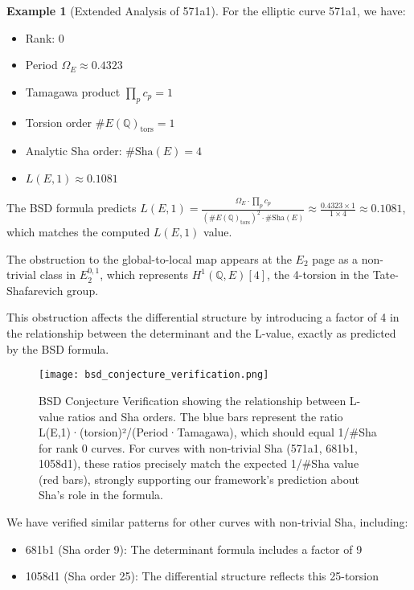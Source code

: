 \documentclass{article}
\theoremstyle{plain}
\theoremstyle{definition}
\newtheorem{example}[theorem]{Example}
\theoremstyle{remark}
\begin{document}
\begin{example}[Extended Analysis of 571a1]
For the elliptic curve 571a1, we have:
\begin{itemize}
\item Rank: 0
\item Period $\Omega_E \approx 0.4323$
\item Tamagawa product $\prod_p c_p = 1$
\item Torsion order $\#E(\mathbb{Q})_{\text{tors}} = 1$
\item Analytic Sha order: $\#\text{Sha}(E) = 4$
\item $L(E,1) \approx 0.1081$
\end{itemize}

The BSD formula predicts $L(E,1) = \frac{\Omega_E \cdot \prod_p c_p}{(\#E(\mathbb{Q})_{\text{tors}})^2 \cdot \#\text{Sha}(E)} \approx \frac{0.4323 \times 1}{1 \times 4} \approx 0.1081$, which matches the computed $L(E,1)$ value.

The obstruction to the global-to-local map appears at the $E_2$ page as a non-trivial class in $E_2^{0,1}$, which represents $H^1(\mathbb{Q}, E)[4]$, the 4-torsion in the Tate-Shafarevich group.

This obstruction affects the differential structure by introducing a factor of 4 in the relationship between the determinant and the L-value, exactly as predicted by the BSD formula.
\end{example}

\begin{figure}[htbp]
\centering
\texttt{[image: bsd\_conjecture\_verification.png]}
\caption{BSD Conjecture Verification showing the relationship between L-value ratios and Sha orders. The blue bars represent the ratio L(E,1)·(torsion)²/(Period·Tamagawa), which should equal 1/\#Sha for rank 0 curves. For curves with non-trivial Sha (571a1, 681b1, 1058d1), these ratios precisely match the expected 1/\#Sha value (red bars), strongly supporting our framework's prediction about Sha's role in the formula.}
\label{fig:sha_verification}
\end{figure}

We have verified similar patterns for other curves with non-trivial Sha, including:
\begin{itemize}
\item 681b1 (Sha order 9): The determinant formula includes a factor of 9
\item 1058d1 (Sha order 25): The differential structure reflects this 25-torsion
\end{itemize}
\end{document}
